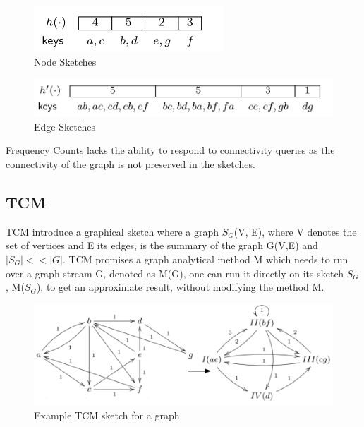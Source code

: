 \documentclass[12pt]{report}
\numberwithin{figure}{section}
\numberwithin{table}{section}
\begin{document}
\begin{figure}[H]
\centering
\includegraphics[scale=0.6]{images/NodeSketches}
\caption{Node Sketches}
\label{fig:NodeSketches}
\end{figure}

\begin{figure}[H]
\centering
\includegraphics[scale=0.6]{images/EdgeSketches}
\caption{Edge Sketches}
\label{fig:EdgeSketches}
\end{figure}

Frequency Counts lacks the ability to respond to connectivity queries as the connectivity of the graph is not preserved in the sketches\cite{TCM}.

\subsection{TCM}

TCM\cite{TCM} introduce a graphical sketch where a graph $S_G$(V, E), where V denotes the set of vertices and E its edges, is the summary of the graph G(V,E) and $|S_G| << |G|$. TCM promises a graph analytical method M which needs to run over a graph stream G, denoted as M(G), one can run it directly on its sketch $S_G$, M($S_G$), to get an approximate result, without modifying the method M.

\begin{figure}[H]
\centering
\includegraphics[scale=0.3]{images/graph-sketching}
\caption{Example TCM sketch for a graph}
\end{figure}

\paragraph{}
\end{document}
